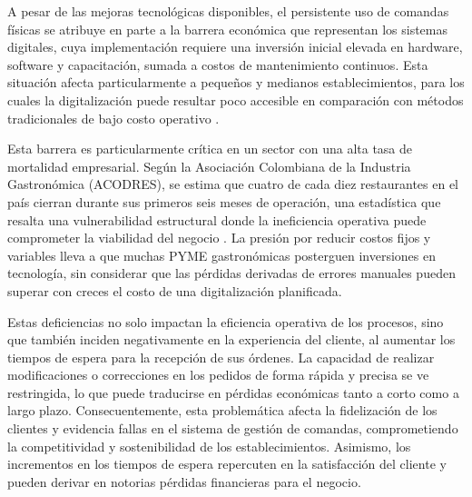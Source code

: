 A pesar de las mejoras tecnológicas disponibles, el persistente uso de comandas físicas se atribuye en parte a la barrera económica que representan los sistemas digitales, cuya implementación requiere una inversión inicial elevada en hardware, software y capacitación, sumada a costos de mantenimiento continuos. Esta situación afecta particularmente a pequeños y medianos establecimientos, para los cuales la digitalización puede resultar poco accesible en comparación con métodos tradicionales de bajo costo operativo \cite{marcelo2024desafios}.

Esta barrera es particularmente crítica en un sector con una alta tasa de mortalidad empresarial. Según la Asociación Colombiana de la Industria Gastronómica (ACODRES), se estima que cuatro de cada diez restaurantes en el país cierran durante sus primeros seis meses de operación, una estadística que resalta una vulnerabilidad estructural donde la ineficiencia operativa puede comprometer la viabilidad del negocio \cite{acodres_estadisticas_2021}. La presión por reducir costos fijos y variables lleva a que muchas PYME gastronómicas posterguen inversiones en tecnología, sin considerar que las pérdidas derivadas de errores manuales pueden superar con creces el costo de una digitalización planificada.

Estas deficiencias no solo impactan la eficiencia operativa de los procesos, sino que también inciden negativamente en la experiencia del cliente, al aumentar los tiempos de espera para la recepción de sus órdenes. La capacidad de realizar modificaciones o correcciones en los pedidos de forma rápida y precisa se ve restringida, lo que puede traducirse en pérdidas económicas tanto a corto como a largo plazo. Consecuentemente, esta problemática afecta la fidelización de los clientes y evidencia fallas en el sistema de gestión de comandas, comprometiendo la competitividad y sostenibilidad de los establecimientos. Asimismo, los incrementos en los tiempos de espera repercuten en la satisfacción del cliente y pueden derivar en notorias pérdidas financieras para el negocio.

